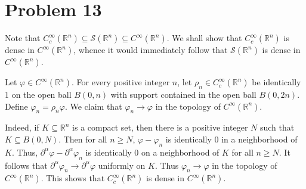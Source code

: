 \documentclass[10pt]{amsart}
\theoremstyle{thmstyle}
\theoremstyle{defstyle}
\newcommand{\R}{\mathbb{R}}
\newcommand{\scrS}{\mathscr S}
\renewcommand{\ge}{\geqslant}
\begin{document}
\section{Problem 13}

Note that $C_c^\infty(\R^n)\subseteq\scrS(\R^n)\subseteq C^\infty(\R^n)$. We shall show that $C_c^\infty(\R^n)$ is dense in $C^\infty(\R^n)$, whence it would immediately follow that $\scrS(\R^n)$ is dense in $C^\infty(\R^n)$.

Let $\varphi\in C^\infty(\R^n)$. For every positive integer $n$, let $\rho_n\in C_c^\infty(\R^n)$ be identically $1$ on the open ball $B(0, n)$ with support contained in the open ball $B(0, 2n)$. Define $\varphi_n = \rho_n\varphi$. We claim that $\varphi_n\to\varphi$ in the topology of $C^\infty(\R^n)$.

Indeed, if $K\subseteq\R^n$ is a compact set, then there is a positive integer $N$ such that $K\subseteq B(0, N)$. Then for all $n\ge N$, $\varphi - \varphi_n$ is identically $0$ in a neighborhood of $K$. Thus, $\partial^\alpha\varphi - \partial^\alpha\varphi_n$ is identically $0$ on a neighborhood of $K$ for all $n\ge N$. It follows that $\partial^\alpha\varphi_n\to\partial^\alpha\varphi$ uniformly on $K$. Thus $\varphi_n\to\varphi$ in the topology of $C^\infty(\R^n)$. This shows that $C_c^\infty(\R^n)$ is dense in $C^\infty(\R^n)$.
\end{document}
